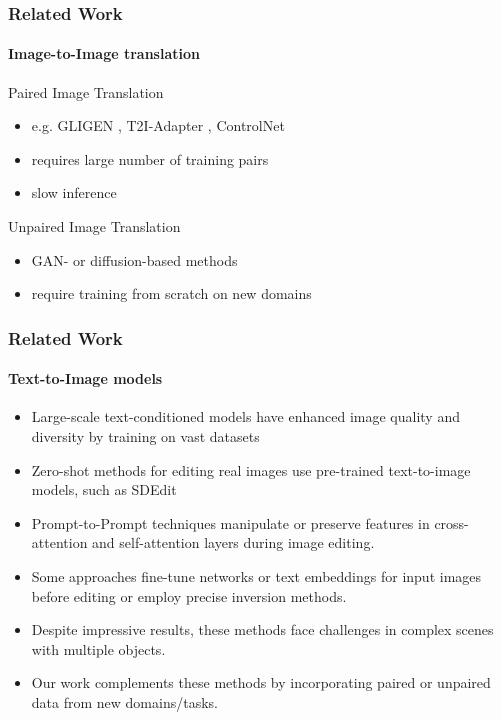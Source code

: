 \begin{frame}
    \frametitle{Related Work}
    \framesubtitle{Image-to-Image translation}
    Paired Image Translation
    \begin{itemize}
        \item e.g. GLIGEN \cite{li2023gligen}, T2I-Adapter \cite{mou2023t2i}, ControlNet \cite{zhang2023adding}
        \item requires large number of training pairs
        \item slow inference
    \end{itemize}
    Unpaired Image Translation
    \begin{itemize}
        \item GAN- or diffusion-based methods \cite{cyclediffusion} \cite{su2022dual} \cite{sasaki2021unitddpm}
        \item require training from scratch on new domains   
    \end{itemize}
\end{frame}
    
\begin{frame}
    \frametitle{Related Work}
    \framesubtitle{Text-to-Image models}
    \begin{itemize}
        \item Large-scale text-conditioned models have enhanced image quality and diversity by training on vast datasets \cite{schuhmann2022laion5b, kakaobrain2022coyo-700m}
        \item Zero-shot methods for editing real images use pre-trained text-to-image models, such as SDEdit \cite{meng2022sdedit}
        \item Prompt-to-Prompt techniques manipulate or preserve features in cross-attention and self-attention layers during image editing.
        \item Some approaches fine-tune networks or text embeddings for input images before editing or employ precise inversion methods.
        \item Despite impressive results, these methods face challenges in complex scenes with multiple objects.
        \item Our work complements these methods by incorporating paired or unpaired data from new domains/tasks.    
    \end{itemize}
\end{frame}
    

